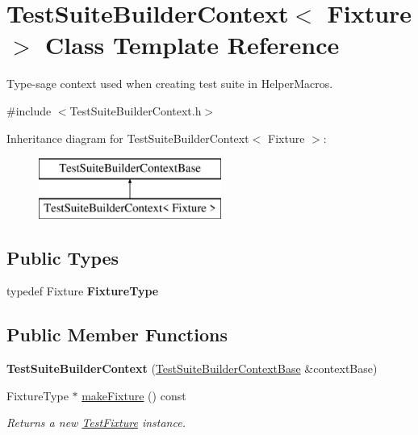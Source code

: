 \hypertarget{class_test_suite_builder_context}{\section{Test\-Suite\-Builder\-Context$<$ Fixture $>$ Class Template Reference}
\label{class_test_suite_builder_context}
}


Type-\/sage context used when creating test suite in Helper\-Macros.  




{\ttfamily \#include $<$Test\-Suite\-Builder\-Context.\-h$>$}

Inheritance diagram for Test\-Suite\-Builder\-Context$<$ Fixture $>$\-:\begin{figure}[H]
\begin{center}
\leavevmode
\includegraphics[height=2.000000cm]{class_test_suite_builder_context}
\end{center}
\end{figure}
\subsection*{Public Types}
\begin{DoxyCompactItemize}
\item 
\hypertarget{class_test_suite_builder_context_a994528427c211ca187b39a9345ea53ee}{typedef Fixture {\bfseries Fixture\-Type}}\label{class_test_suite_builder_context_a994528427c211ca187b39a9345ea53ee}

\end{DoxyCompactItemize}
\subsection*{Public Member Functions}
\begin{DoxyCompactItemize}
\item 
\hypertarget{class_test_suite_builder_context_a51c0c0c846df2790ea1866c61e9b3e39}{{\bfseries Test\-Suite\-Builder\-Context} (\hyperlink{class_test_suite_builder_context_base}{Test\-Suite\-Builder\-Context\-Base} \&context\-Base)}\label{class_test_suite_builder_context_a51c0c0c846df2790ea1866c61e9b3e39}

\item 
Fixture\-Type $\ast$ \hyperlink{class_test_suite_builder_context_a8f5c2fa277582411aa49bfbbe6d72d11}{make\-Fixture} () const 
\begin{DoxyCompactList}\small\item\em Returns a new \hyperlink{class_test_fixture}{Test\-Fixture} instance. \end{DoxyCompactList}\end{DoxyCompactItemize}
